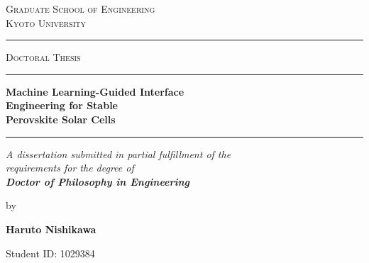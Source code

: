 \documentclass[12pt,a4paper,oneside]{report}
\begin{document}
\begin{titlepage}
\thispagestyle{empty}
\begin{center}
\vspace*{0.3cm}

{\small\scshape\color{inkgray} Graduate School of Engineering}\\[2pt]
{\small\scshape\color{inkgray} Kyoto University}\\[10pt]

{\color{kyotogold}\rule{0.55\linewidth}{0.8pt}}

\vspace{1.0cm}

{\Large\scshape\color{inkgray} Doctoral Thesis}

\vspace{0.9cm}

{\color{kyotomaroon}\rule{0.32\linewidth}{1.6pt}}

\vspace{0.5cm}

{\fontsize{22}{27}\selectfont\bfseries\color{kyotomaroon}
Machine Learning-Guided Interface\\[3pt] Engineering for Stable\\[3pt] Perovskite Solar Cells}

\vspace{0.5cm}

{\color{kyotomaroon}\rule{0.32\linewidth}{1.6pt}}

\vspace{0.7cm}

{\normalsize\itshape\color{inkgray}
A dissertation submitted in partial fulfillment of the\\
requirements for the degree of\\
\textbf{Doctor of Philosophy in Engineering}}

\vspace{1.0cm}

{\normalsize\color{inkgray} by}

\vspace{0.3cm}

{\LARGE\bfseries\color{inkgray} Haruto Nishikawa}

\vspace{0.2cm}

{\small\color{inkgray} Student ID: 1029384}


\end{center}
\end{titlepage}
\end{document}
